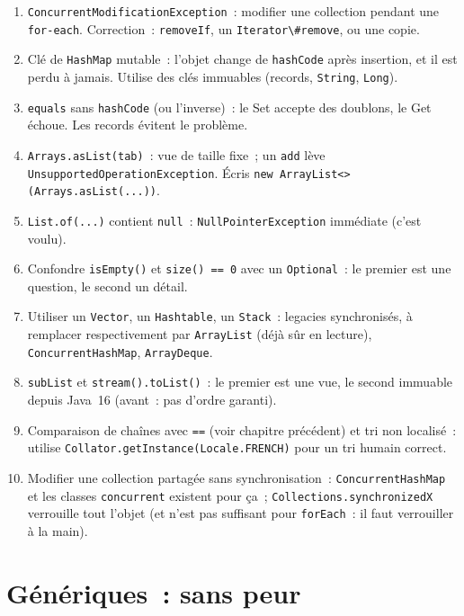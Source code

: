 \begin{enumerate}
  \item \verb|ConcurrentModificationException|~: modifier une collection pendant une
        \verb|for-each|. Correction~: \verb|removeIf|, un \verb|Iterator\#remove|, ou une copie.
  \item Cl\'e de \verb|HashMap| mutable~: l'objet change de \verb|hashCode| apr\`es insertion, et il est
        perdu \`a jamais. Utilise des cl\'es immuables (records, \verb|String|, \verb|Long|).
  \item \verb|equals| sans \verb|hashCode| (ou l'inverse)~: le Set accepte des doublons, le Get
        \'echoue. Les records \'evitent le probl\`eme.
  \item \verb|Arrays.asList(tab)|~: vue de taille fixe~; un \verb|add| l\`eve
        \verb|UnsupportedOperationException|. \'Ecris \verb|new ArrayList<>(Arrays.asList(...))|.
  \item \verb|List.of(...)| contient \verb|null|~: \verb|NullPointerException| imm\'ediate (c'est voulu).
  \item Confondre \verb|isEmpty()| et \verb|size() == 0| avec un \verb|Optional|~: le premier est
        une question, le second un d\'etail.
  \item Utiliser un \verb|Vector|, un \verb|Hashtable|, un \verb|Stack|~: legacies synchronis\'es,
        \`a remplacer respectivement par \verb|ArrayList| (d\'ej\`a s\^ur en lecture), \verb|ConcurrentHashMap|,
        \verb|ArrayDeque|.
  \item \verb|subList| et \verb|stream().toList()|~: le premier est une vue, le second immuable
        depuis Java~16 (avant~: pas d'ordre garanti).
  \item Comparaison de cha\^ines avec \verb|==| (voir chapitre pr\'ec\'edent) et tri non localis\'e~:
        utilise \verb|Collator.getInstance(Locale.FRENCH)| pour un tri humain correct.
  \item Modifier une collection partag\'ee sans synchronisation~: \verb|ConcurrentHashMap| et les
        classes \verb|concurrent| existent pour \c{c}a~; \verb|Collections.synchronizedX| verrouille
        tout l'objet (et n'est pas suffisant pour \verb|forEach|~: il faut verrouiller \`a la main).
\end{enumerate}

\section{G\'en\'eriques~: sans peur}

